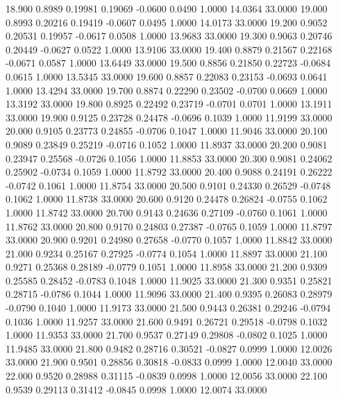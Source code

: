   18.900   0.8989   0.19981   0.19069  -0.0600   0.0490   1.0000  14.0364  33.0000
  19.000   0.8993   0.20216   0.19419  -0.0607   0.0495   1.0000  14.0173  33.0000
  19.200   0.9052   0.20531   0.19957  -0.0617   0.0508   1.0000  13.9683  33.0000
  19.300   0.9063   0.20746   0.20449  -0.0627   0.0522   1.0000  13.9106  33.0000
  19.400   0.8879   0.21567   0.22168  -0.0671   0.0587   1.0000  13.6449  33.0000
  19.500   0.8856   0.21850   0.22723  -0.0684   0.0615   1.0000  13.5345  33.0000
  19.600   0.8857   0.22083   0.23153  -0.0693   0.0641   1.0000  13.4294  33.0000
  19.700   0.8874   0.22290   0.23502  -0.0700   0.0669   1.0000  13.3192  33.0000
  19.800   0.8925   0.22492   0.23719  -0.0701   0.0701   1.0000  13.1911  33.0000
  19.900   0.9125   0.23728   0.24478  -0.0696   0.1039   1.0000  11.9199  33.0000
  20.000   0.9105   0.23773   0.24855  -0.0706   0.1047   1.0000  11.9046  33.0000
  20.100   0.9089   0.23849   0.25219  -0.0716   0.1052   1.0000  11.8937  33.0000
  20.200   0.9081   0.23947   0.25568  -0.0726   0.1056   1.0000  11.8853  33.0000
  20.300   0.9081   0.24062   0.25902  -0.0734   0.1059   1.0000  11.8792  33.0000
  20.400   0.9088   0.24191   0.26222  -0.0742   0.1061   1.0000  11.8754  33.0000
  20.500   0.9101   0.24330   0.26529  -0.0748   0.1062   1.0000  11.8738  33.0000
  20.600   0.9120   0.24478   0.26824  -0.0755   0.1062   1.0000  11.8742  33.0000
  20.700   0.9143   0.24636   0.27109  -0.0760   0.1061   1.0000  11.8762  33.0000
  20.800   0.9170   0.24803   0.27387  -0.0765   0.1059   1.0000  11.8797  33.0000
  20.900   0.9201   0.24980   0.27658  -0.0770   0.1057   1.0000  11.8842  33.0000
  21.000   0.9234   0.25167   0.27925  -0.0774   0.1054   1.0000  11.8897  33.0000
  21.100   0.9271   0.25368   0.28189  -0.0779   0.1051   1.0000  11.8958  33.0000
  21.200   0.9309   0.25585   0.28452  -0.0783   0.1048   1.0000  11.9025  33.0000
  21.300   0.9351   0.25821   0.28715  -0.0786   0.1044   1.0000  11.9096  33.0000
  21.400   0.9395   0.26083   0.28979  -0.0790   0.1040   1.0000  11.9173  33.0000
  21.500   0.9443   0.26381   0.29246  -0.0794   0.1036   1.0000  11.9257  33.0000
  21.600   0.9491   0.26721   0.29518  -0.0798   0.1032   1.0000  11.9353  33.0000
  21.700   0.9537   0.27149   0.29808  -0.0802   0.1025   1.0000  11.9485  33.0000
  21.800   0.9482   0.28716   0.30521  -0.0827   0.0999   1.0000  12.0026  33.0000
  21.900   0.9501   0.28856   0.30818  -0.0833   0.0999   1.0000  12.0040  33.0000
  22.000   0.9520   0.28988   0.31115  -0.0839   0.0998   1.0000  12.0056  33.0000
  22.100   0.9539   0.29113   0.31412  -0.0845   0.0998   1.0000  12.0074  33.0000
